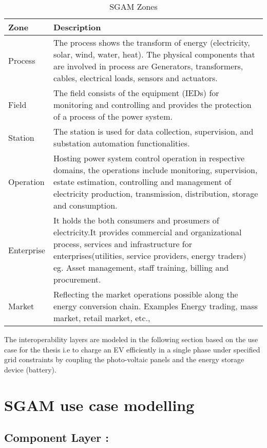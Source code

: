 \begin{table}[h!b]
	\centering
	\begin{tabular} { | l | p{14cm} | }
    \hline
		\textbf{Zone} & \textbf{Description} \\ 
		\hline
		Process & The process shows the transform of energy (electricity, solar, wind, water,
heat). The physical components that are involved in process are Generators,
transformers, cables, electrical loads, sensors and actuators. \\ 
		\hline
		Field & The field consists of the equipment (IEDs) for monitoring and controlling and
provides the protection of a process of the power system. \\ 
        \hline
        Station & The station is used for data collection, supervision, and substation
automation functionalities.\\ 
		\hline
        Operation & Hosting power system control operation in respective domains, the
operations include monitoring, supervision, estate estimation, controlling and
management of electricity production, transmission, distribution, storage and
consumption. \\ 
		\hline
        Enterprise & It holds the both consumers and prosumers of electricity.It provides commercial and organizational process, services and
infrastructure for enterprises(utilities, service providers, energy traders) eg.
Asset management, staff training, billing and procurement. \\
		\hline
        Market & Reflecting the market operations possible along the energy conversion
chain. Examples Energy trading, mass market, retail market, etc.,\\ 
		\hline
	\end{tabular}
    \caption{SGAM Zones}
    \label{table:3} 
\end{table}
\clearpage
The interoperability layers are modeled in the following section based on the use case for the thesis i.e to charge an EV efficiently in a single phase under specified grid constraints by coupling the
photo-voltaic panels and the energy storage device (battery).

\section{SGAM use case modelling }
\subsection{Component Layer :}

